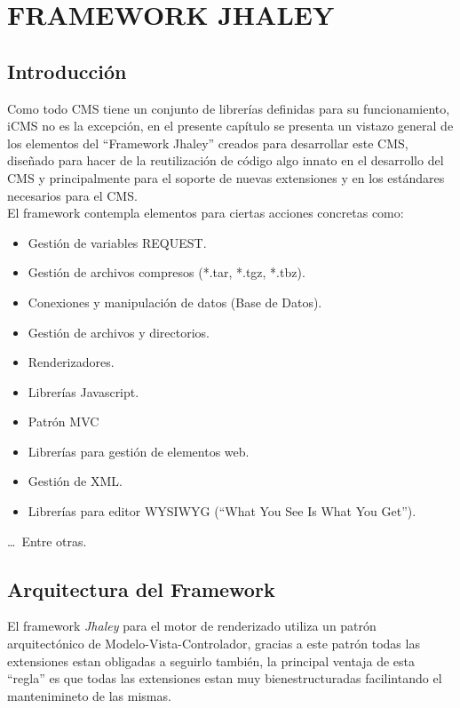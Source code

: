 \chapter{FRAMEWORK JHALEY}
\newpage
\section{Introducci\'on}
Como todo CMS tiene un conjunto de librer\'ias definidas para su funcionamiento, iCMS no es la excepci\'on, en el presente cap\'itulo se presenta un vistazo general de los elementos del ``Framework Jhaley'' creados para desarrollar este CMS, dise\~nado para hacer de la reutilizaci\'on de c\'odigo algo innato en el desarrollo del CMS y principalmente para el soporte de nuevas extensiones y en los est\'andares necesarios para el CMS.\\
El framework contempla elementos para ciertas acciones concretas como: 
\begin{itemize}
\item Gesti\'on de variables REQUEST.
\item Gesti\'on de archivos compresos (*.tar, *.tgz, *.tbz).
\item Conexiones y manipulaci\'on de datos (Base de Datos).
\item Gesti\'on de archivos y directorios.
\item Renderizadores.
\item Librer\'ias Javascript.
\item Patr\'on MVC
\item Librer\'ias para gesti\'on de elementos web.
\item Gesti\'on de XML.
\item Librer\'ias para editor WYSIWYG (``What You See Is What You Get'').
\end{itemize}
\ldots\ Entre otras.

\section{Arquitectura del Framework}
El framework \textit{Jhaley} para el motor de renderizado utiliza un patr\'on arquitect\'onico de Modelo-Vista-Controlador, gracias a este patr\'on todas las extensiones estan obligadas a seguirlo tambi\'en, la principal ventaja de esta ``regla'' es que todas las extensiones estan muy bienestructuradas facilintando el mantenimineto de las mismas.\\

